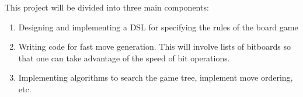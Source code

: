\documentclass{scrartcl}
\begin{document}
This project will be divided into three main components:

\begin{enumerate}
\item Designing and implementing a DSL for specifying the rules of the board game
\item Writing code for fast move generation. This will involve lists of bitboards so that one can take advantage of the speed of bit operations.
\item Implementing algorithms to search the game tree, implement move ordering, etc.
\end{enumerate}
\end{document}
